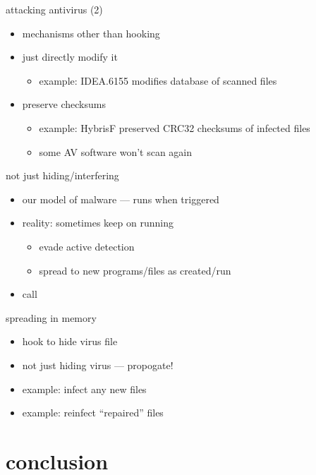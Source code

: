 \begin{frame}{attacking antivirus (2)}
    \begin{itemize}
    \item mechanisms other than hooking
    \item just directly modify it
        \begin{itemize}
        \item example: IDEA.6155 modifies database of scanned files
        \end{itemize}
    \item preserve checksums
        \begin{itemize}
        \item example: HybrisF preserved CRC32 checksums of infected files
        \item some AV software won't scan again
        \end{itemize}
    \end{itemize}
\end{frame}

\begin{frame}{not just hiding/interfering}
    \begin{itemize}
    \item our model of malware --- runs when triggered
    \item reality: sometimes keep on running
        \begin{itemize}
        \item evade active detection
        \item spread to new programs/files as created/run
        \end{itemize}
    \item call 
    \end{itemize}
\end{frame}

\begin{frame}{spreading in memory}
    \begin{itemize}
    \item hook to hide virus file
    \item not just hiding virus --- propogate!
    \item example: infect any new files
    \item example: reinfect ``repaired'' files
    \end{itemize}
\end{frame}

\section{conclusion}

